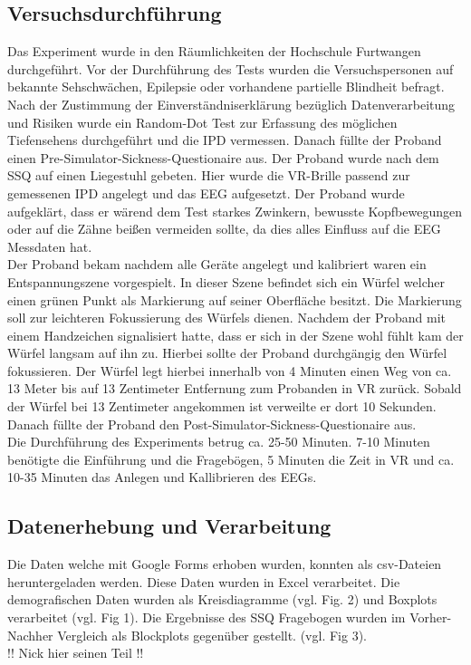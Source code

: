 \documentclass[conference]{IEEEtran}
\begin{document}
\subsection{Versuchsdurchführung}
Das Experiment wurde in den Räumlichkeiten der Hochschule Furtwangen durchgeführt. Vor der Durchführung des Tests wurden die Versuchspersonen auf bekannte Sehschwächen, Epilepsie oder vorhandene partielle Blindheit befragt. Nach der Zustimmung der Einverständniserklärung bezüglich Datenverarbeitung und Risiken wurde ein Random-Dot Test zur Erfassung des möglichen Tiefensehens durchgeführt und die IPD vermessen. Danach füllte der Proband einen Pre-Simulator-Sickness-Questionaire aus. Der Proband wurde nach dem SSQ auf einen Liegestuhl gebeten. Hier wurde die VR-Brille passend zur gemessenen IPD angelegt und das EEG aufgesetzt. Der Proband wurde aufgeklärt, dass er wärend dem Test starkes Zwinkern, bewusste Kopfbewegungen oder auf die Zähne beißen vermeiden sollte, da dies alles Einfluss auf die EEG Messdaten hat.\\
Der Proband bekam nachdem alle Geräte angelegt und kalibriert waren ein Entspannungszene vorgespielt. In dieser Szene befindet sich ein Würfel welcher einen grünen Punkt als Markierung auf seiner Oberfläche besitzt. Die Markierung soll zur leichteren Fokussierung des Würfels dienen. Nachdem der Proband mit einem Handzeichen signalisiert hatte, dass er sich in der Szene wohl fühlt kam der Würfel langsam auf ihn zu. Hierbei sollte der Proband durchgängig den Würfel fokussieren. Der Würfel legt hierbei innerhalb von 4 Minuten einen Weg von ca. 13 Meter bis auf 13 Zentimeter Entfernung zum Probanden in VR zurück. Sobald der Würfel bei 13 Zentimeter angekommen ist verweilte er dort 10 Sekunden. Danach füllte der Proband den Post-Simulator-Sickness-Questionaire aus.\\
Die Durchführung des Experiments betrug ca. 25-50 Minuten. 7-10 Minuten benötigte die Einführung und die Fragebögen, 5 Minuten die Zeit in VR und ca. 10-35 Minuten das Anlegen und Kallibrieren des EEGs. 

\subsection{Datenerhebung und Verarbeitung}
Die Daten welche mit Google Forms erhoben wurden, konnten als csv-Dateien heruntergeladen werden. Diese Daten wurden in Excel verarbeitet. Die demografischen Daten wurden als Kreisdiagramme (vgl. Fig. 2) und Boxplots verarbeitet (vgl. Fig 1).
Die Ergebnisse des SSQ Fragebogen wurden im Vorher-Nachher Vergleich als Blockplots gegenüber gestellt. (vgl. Fig 3).\\
!! Nick hier seinen Teil !!
\end{document}
